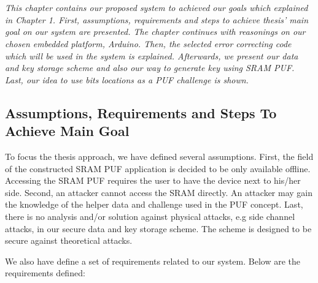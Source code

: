 \chapter{\chapterFour}
\label{chp:4}

\textit{This chapter contains our proposed system to achieved our goals which explained in Chapter 1. First, assumptions, requirements and steps to achieve thesis' main goal on our system are presented. The chapter continues with reasonings on our chosen embedded platform, Arduino. Then, the selected error correcting code which will be used in the system is explained. Afterwards, we present our data and key storage scheme and also our way to generate key using SRAM PUF. Last, our idea to use bits locations as a PUF challenge is shown. }

\section{Assumptions, Requirements and Steps To Achieve Main Goal}\label{ch:use_case}

To focus the thesis approach, we have defined several assumptions. First, the field of the constructed SRAM PUF application is decided to be only available offline. Accessing the SRAM PUF requires the user to have the device next to his/her side. Second, an attacker cannot access the SRAM directly. An attacker may gain the knowledge of the helper data and challenge used in the PUF concept. Last, there is no analysis and/or solution against physical attacks, e.g side channel attacks, in our secure data and key storage scheme. The scheme is designed to be secure against theoretical attacks.

We also have define a set of requirements related to our system. Below are the requirements defined:


